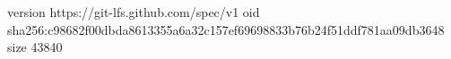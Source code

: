 version https://git-lfs.github.com/spec/v1
oid sha256:c98682f00dbda8613355a6a32c157ef69698833b76b24f51ddf781aa09db3648
size 43840

